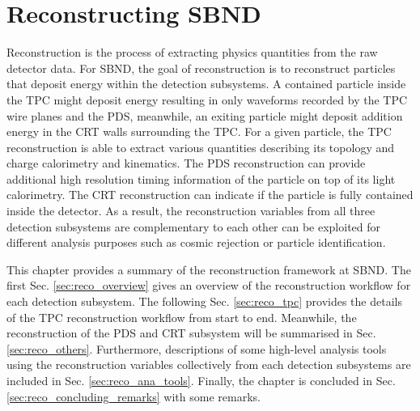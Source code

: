 
\chapter{Reconstructing SBND}
\label{ChapterReco}

\ifpdf
    \graphicspath{{Chapter7/Figs/Raster/}{Chapter7/Figs/PDF/}{Chapter7/Figs/}}
\else
    \graphicspath{{Chapter7/Figs/Vector/}{Chapter7/Figs/}}
\fi


Reconstruction is the process of extracting physics quantities from the raw detector data.
For SBND, the goal of reconstruction is to reconstruct particles that deposit energy within the detection subsystems.
A contained particle inside the TPC might deposit energy resulting in only waveforms recorded by the TPC wire planes and the PDS, meanwhile, an exiting particle might deposit addition energy in the CRT walls surrounding the TPC.
For a given particle, the TPC reconstruction is able to extract various quantities describing its topology and charge calorimetry and kinematics.
The PDS reconstruction can provide additional high resolution timing information of the particle on top of its light calorimetry.
The CRT reconstruction can indicate if the particle is fully contained inside the detector.
As a result, the reconstruction variables from all three detection subsystems are complementary to each other can be exploited for different analysis purposes such as cosmic rejection or particle identification. 

This chapter provides a summary of the reconstruction framework at SBND.
The first Sec. \ref{sec:reco_overview} gives an overview of the reconstruction workflow for each detection subsystem. 
The following Sec. \ref{sec:reco_tpc} provides the details of the TPC reconstruction workflow from start to end.
Meanwhile, the reconstruction of the PDS and CRT subsystem will be summarised in Sec. \ref{sec:reco_others}.
Furthermore, descriptions of some high-level analysis tools using the reconstruction variables collectively from each detection subsystems are included in Sec. \ref{sec:reco_ana_tools}.
Finally, the chapter is concluded in Sec. \ref{sec:reco_concluding_remarks} with some remarks.

